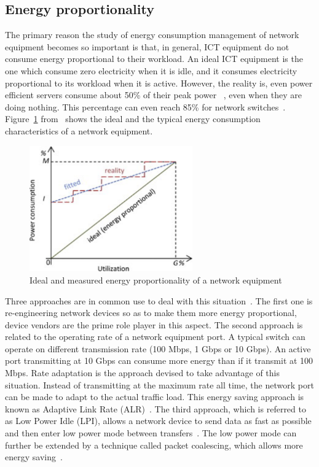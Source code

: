 \subsection{Energy proportionality}
\label{section:energyproportionality}
The primary reason the study of energy consumption management of network equipment becomes so important is that, in general, ICT equipment do not consume energy proportional to their workload. An ideal ICT equipment is the one which consume zero electricity when it is idle, and it consumes electricity proportional to its workload when it is active. However, the reality is, even power efficient servers consume about 50\% of their peak power ~\cite{DBLP:journals/computer/BarrosoH07}, even when they are doing nothing. This percentage can even reach 85\% for network switches~\cite{DBLP:conf/IEEEcloud/FiandrinoKBZ15}. Figure~\ref{fig:energyproportionality} from~\cite{DBLP:conf/networking/MahadevanSBR09} shows the ideal and the typical energy consumption characteristics of a network equipment. 
\begin{figure}[htb]
	\begin{center}
		\includegraphics[width=7cm]{images/energyproportionality.pdf}
		
		\caption{Ideal and measured energy proportionality of a network equipment~\cite{DBLP:conf/networking/MahadevanSBR09}}
		\label{fig:energyproportionality}
	\end{center}
	\vspace*{-0.2cm}
\end{figure}

Three approaches are in common use to deal with this situation~\cite{DBLP:journals/comsur/BollaBDC11}. The first one is re-engineering network devices so as to make them more energy proportional, device vendors are the prime role player in this aspect. The second approach is related to the operating rate of a network equipment port. A typical switch can operate on different transmission rate (100 Mbps, 1 Gbps or 10 Gbps). An active port transmitting at 10 Gbps can consume more energy than if it transmit at 100 Mbps. Rate adaptation is the approach devised to take advantage of this situation. Instead of transmitting at the maximum rate all time,  the network port can be made to adapt to the actual traffic load. This energy saving approach is known as Adaptive Link Rate (ALR)~\cite{DBLP:conf/nsdi/NedevschiPIRW08}. The third approach, which is referred to as Low Power Idle (LPI), allows a network device to send data as fast as possible and then enter low power mode between transfers~\cite{DBLP:journals/computer/BarrosoH07}. The low power mode can further be extended by a technique called packet coalescing, which allows more energy saving~\cite{DBLP:journals/comsur/BollaBDC11}. 
